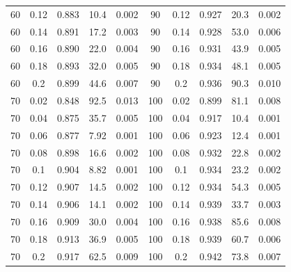 \documentclass[12pt]{article}
\begin{document}
\begin{table}[hb!]
\begin{tabular}{c c | c | c c ||c c | c | c c |}
                60&0.12&0.883&10.4&0.002	&	90&0.12&0.927&20.3&0.002\\
                60&0.14&0.891&17.2&0.003	&	90&0.14&0.928&53.0&0.006\\
                60&0.16&0.890&22.0&0.004	&	90&0.16&0.931&43.9&0.005\\
                60&0.18&0.893&32.0&0.005	&	90&0.18&0.934&48.1&0.005\\
                60&0.2&0.899&44.6&0.007	&	90&0.2&0.936&90.3&0.010\\
                70&0.02&0.848&92.5&0.013	&	100&0.02&0.899&81.1&0.008\\
                70&0.04&0.875&35.7&0.005	&	100&0.04&0.917&10.4&0.001\\
                70&0.06&0.877&7.92&0.001	&	100&0.06&0.923&12.4&0.001\\
                70&0.08&0.898&16.6&0.002	&	100&0.08&0.932&22.8&0.002\\
                70&0.1&0.904&8.82&0.001	&	100&0.1&0.934&23.2&0.002\\
                70&0.12&0.907&14.5&0.002	&	100&0.12&0.934&54.3&0.005\\
                70&0.14&0.906&14.1&0.002	&	100&0.14&0.939&33.7&0.003\\
                70&0.16&0.909&30.0&0.004	&	100&0.16&0.938&85.6&0.008\\
                70&0.18&0.913&36.9&0.005	&	100&0.18&0.939&60.7&0.006\\
                70&0.2&0.917&62.5&0.009	&	100&0.2&0.942&73.8&0.007\\
				\hline
			\end{tabular}
			\end{table}
\end{document}
